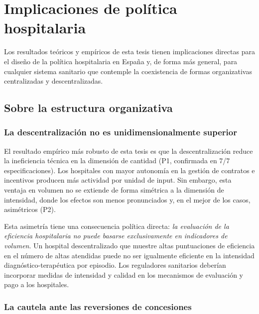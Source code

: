 \documentclass[12pt, a4paper, twoside, openright]{book}
\theoremstyle{plain}
\theoremstyle{definition}
\theoremstyle{remark}
\begin{document}
\chapter{Implicaciones de política hospitalaria}
\label{ch:politica}

Los resultados teóricos y empíricos de esta tesis tienen implicaciones directas para el diseño de la política hospitalaria en España y, de forma más general, para cualquier sistema sanitario que contemple la coexistencia de formas organizativas centralizadas y descentralizadas.

\section{Sobre la estructura organizativa}

\subsection{La descentralización no es unidimensionalmente superior}

El resultado empírico más robusto de esta tesis es que la descentralización reduce la ineficiencia técnica en la dimensión de cantidad (P1, confirmada en 7/7 especificaciones). Los hospitales con mayor autonomía en la gestión de contratos e incentivos producen más actividad por unidad de input. Sin embargo, esta ventaja en volumen no se extiende de forma simétrica a la dimensión de intensidad, donde los efectos son menos pronunciados y, en el mejor de los casos, asimétricos (P2).

Esta asimetría tiene una consecuencia política directa: \textit{la evaluación de la eficiencia hospitalaria no puede basarse exclusivamente en indicadores de volumen}. Un hospital descentralizado que muestre altas puntuaciones de eficiencia en el número de altas atendidas puede no ser igualmente eficiente en la intensidad diagnóstico-terapéutica por episodio. Los reguladores sanitarios deberían incorporar medidas de intensidad y calidad en los mecanismos de evaluación y pago a los hospitales.

\subsection{La cautela ante las reversiones de concesiones}
\end{document}
